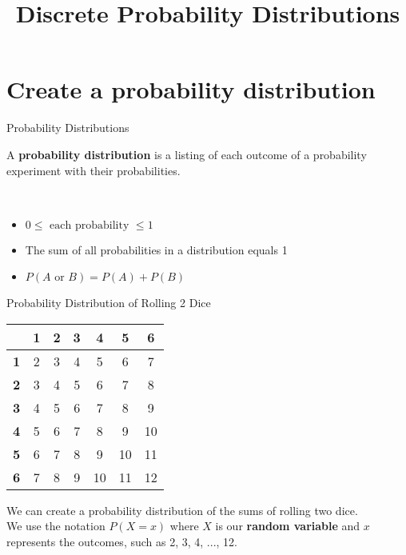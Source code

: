 \documentclass[t]{beamer}
\title{Discrete Probability Distributions}
\author{}
\date{}
\begin{document}
\begin{frame} 
\maketitle
\end{frame}

\section{Create a probability distribution}

\begin{frame}{Probability Distributions}
\begin{tcolorbox}[colframe=green!20!black, colback = green!30!white,title=\textbf{Probability Distribution}]
A \textbf{probability distribution} is a listing of each outcome of a probability experiment with their probabilities.
\end{tcolorbox}
\vspace{10pt} 

	\newline\\

\begin{itemize}
	\item<4-> $0 \leq \text{ each probability } \leq 1$
	\item<5-> The sum of all probabilities in a distribution equals 1
	\item<6-> $P(A \text{ or } B) = P(A) + P(B)$
\end{itemize}
\end{frame}

\begin{frame}{Probability Distribution of Rolling 2 Dice}
\begin{center}
\begin{tabular}{c|cccccc}
			&	\textbf{1}	&	\textbf{2}	&	\textbf{3}	&	\textbf{4}	&	\textbf{5}	&	\textbf{6}	\\	\hline
\textbf{1}	&		2		&		3		&		4		&		5		&		6		&		7		\\
\textbf{2}	&		3		&		4		&		5		&		6		&		7		&		8		\\
\textbf{3}	&		4		&		5		&		6		&		7		&		8		&		9		\\
\textbf{4}	&		5		&		6		&		7		&		8		&		9		&		10		\\
\textbf{5}	&		6		&		7		&		8		&		9		&		10		&		11		\\
\textbf{6}	&		7		&		8		&		9		&		10		&		11		&		12		\\
\end{tabular}
\end{center}
We can create a probability distribution of the sums of rolling two dice. \newline\\	\pause
We use the notation $P(X=x)$ where $X$ is our {\color{blue}\textbf{random variable}} and $x$ represents the outcomes, such as 2, 3, 4, ..., 12.
\end{frame}
\end{document}
